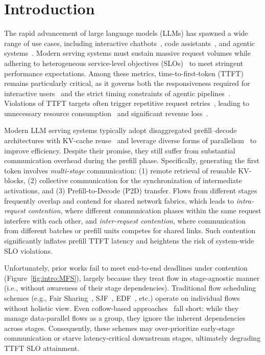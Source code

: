 \section{Introduction}
The rapid advancement of large language models (LLMs) has spawned a wide range of use cases, including interactive chatbots~\cite{zheng2023judging,chiang2023vicuna,openai2024gpt4}, code assistants~\cite{liu2024exploring,zhong2024can}, and agentic systems~\cite{talebirad2023multi,he2025llm,yu2024fincon}.
Modern serving systems must sustain massive request volumes while adhering to heterogeneous service-level objectives (SLOs)~\cite{tempo2025,patke2024queue,hongsola,chen2025slos,shen2025accelgen} to meet stringent performance expectations.
Among these metrics, time-to-first-token (TTFT) remains particularly critical, as it governs both the responsiveness required for interactive users~\cite{wang2024revisiting,ethiraj2025toward} and the strict timing constraints of agentic pipelines~\cite{LiteLLM,langfuse,notdiamond}.
Violations of TTFT targets often trigger repetitive request retries~\cite{Medium1,Medium2}, leading to unnecessary resource consumption~\cite{mooncake} and significant revenue loss~\cite{ranganathan2025enhancing}.



Modern LLM serving systems typically adopt disaggregated prefill–decode architectures with KV-cache reuse~\cite{distserve,splitwise,strati2024d,hu2024inference,mooncakefast,hu2024memserve,cachedattention,cacheblend} and leverage diverse forms of  parallelism~\cite{expertparallel,deepspeedMoE,deepseektech,comet} to improve efficiency. Despite their promise, they still suffer from substantial communication overhead during the prefill phase. Specifically, generating the first token involves \emph{multi-stage} communication: (1) remote retrieval of reusable KV-blocks, (2) collective communication for the synchronization of intermediate activations, and (3) Prefill-to-Decode (P2D) transfer. Flows from different stages frequently overlap and contend for shared network fabrics, which leads to \emph{intra-request contention}, where different communication phases within the same request interfere with each other, and \emph{inter-request contention}, where communication from different batches or prefill units competes for shared links. Such contention significantly inflates prefill TTFT latency and heightens the risk of system-wide SLO violations.

Unfortunately, prior works fail to meet end-to-end deadlines under contention (Figure~\ref{fig:intro:MFS}), largely because they treat flow in stage-agnostic manner (i.e., without awareness of their stage dependencies). Traditional flow scheduling schemes (e.g., Fair Sharing~\cite{dctcp,dcqcn}, SJF~\cite{pfabric,PDQ,pias,li2024flow}, EDF~\cite{D3,d2tcp,PDQ}, etc.) operate on individual flows without holistic view. Even coflow-based approaches~\cite{varys,Aalo,zhang2016coda,zhao2015rapier,agarwal2018sincronia,wan2025coflow} fall short: while they manage data-parallel flows as a group, they ignore the inherent dependencies across stages. Consequently, these schemes may over-prioritize early-stage communication or starve latency-critical downstream stages, ultimately degrading TTFT SLO attainment.

